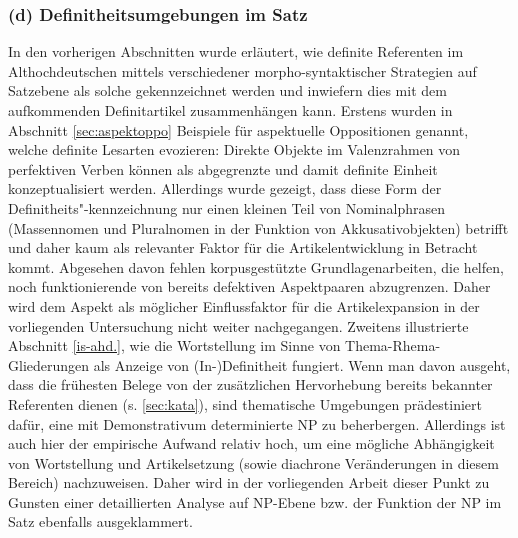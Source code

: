 \subsubsection{(d) Definitheitsumgebungen im Satz} 

In den vorherigen Abschnitten wurde erläutert, wie definite Referenten im Althochdeutschen mittels verschiedener morpho-syntaktischer Strategien auf Satzebene als solche gekennzeichnet werden und inwiefern dies mit dem aufkommenden Definitartikel zusammenhängen kann. Erstens wurden in Abschnitt \ref{sec:aspektoppo} Beispiele für aspektuelle Oppositionen genannt, welche  definite Lesarten evozieren: Direkte Objekte im Valenzrahmen von perfektiven Verben können als abgegrenzte und damit definite Einheit konzeptualisiert werden. Allerdings wurde gezeigt, dass diese Form der Definitheits"-kennzeichnung nur einen kleinen Teil von Nominalphrasen (Massennomen und Pluralnomen in der Funktion von Akkusativobjekten) betrifft und daher kaum als relevanter Faktor für die Artikelentwicklung in Betracht kommt. Abgesehen davon fehlen korpusgestützte Grundlagenarbeiten, die helfen, noch funktionierende von bereits defektiven Aspektpaaren abzugrenzen. Daher wird dem Aspekt als möglicher Einflussfaktor für die Artikelexpansion in der vorliegenden Untersuchung nicht weiter nachgegangen. Zweitens illustrierte Abschnitt \ref{is-ahd.}, wie die Wortstellung im Sinne von Thema-Rhema-Gliederungen als Anzeige von (In-)Definitheit fungiert. Wenn man davon ausgeht, dass die frühesten Belege von  der zusätzlichen Hervorhebung bereits bekannter Referenten dienen (s. \ref{sec:kata}), sind thematische Umgebungen prädestiniert dafür, eine mit Demonstrativum determinierte NP zu beherbergen. Allerdings ist auch hier der empirische Aufwand relativ hoch, um eine mögliche Abhängigkeit von Wortstellung und Artikelsetzung (sowie diachrone Veränderungen in diesem Bereich) nachzuweisen. Daher wird in der vorliegenden Arbeit  dieser Punkt zu Gunsten einer detaillierten Analyse auf NP-Ebene bzw. der Funktion der NP im Satz ebenfalls ausgeklammert.

